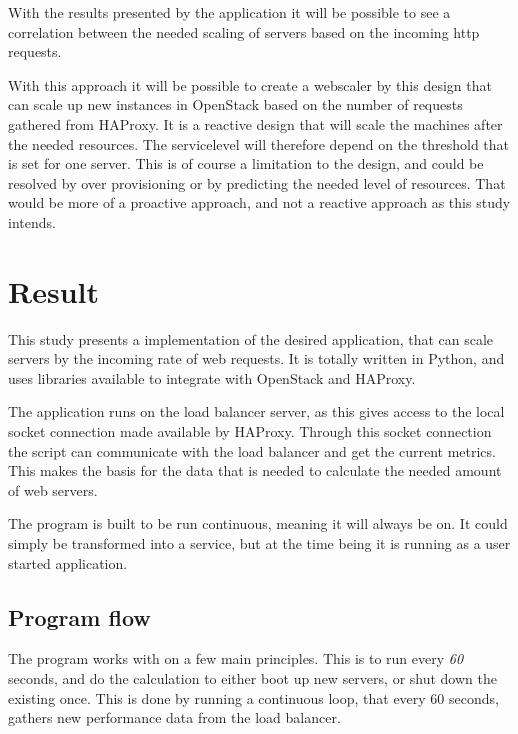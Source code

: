 With the results presented by the application it will be possible to see a
correlation between the needed scaling of servers based on the incoming http
requests.

With this approach it will be possible to create a webscaler by this design
that can scale up new instances in OpenStack based on the number of requests
gathered from HAProxy. It is a reactive design that will scale the machines
after the needed resources. The servicelevel will therefore depend on the
threshold that is set for one server. This is of course a limitation to the
design, and could be resolved by over provisioning or by predicting the needed
level of resources. That would be more of a proactive approach, and not a
reactive approach as this study intends.

\section{Result}
This study presents a implementation of the desired application, that can scale
servers by the incoming rate of web requests. It is totally written in Python,
and uses libraries available to integrate with OpenStack and HAProxy.

The application runs on the load balancer server, as this gives access to the
local socket connection made available by HAProxy. Through this socket
connection the script can communicate with the load balancer and get the
current metrics. This makes the basis for the data that is needed to calculate
the needed amount of web servers.

The program is built to be run continuous, meaning it will always be on. It
could simply be transformed into a service, but at the time being it is
running as a user started application. 

\subsection{Program flow}
The program works with on a few main principles. This is to run every
\textit{60} seconds, and do the calculation to either boot up new servers, or
shut down the existing once. This is done by running a continuous loop, that
every 60 seconds, gathers new performance data from the load balancer. 

